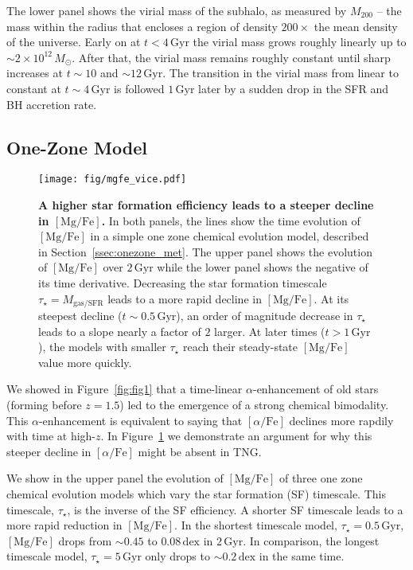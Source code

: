 \documentclass[linenumbers, twocolumn]{aastex631}
\newcommand{\Msun}{\ensuremath{M_{\odot}}}
\newcommand{\Gyr}{\ensuremath{\textrm{Gyr}}}
\newcommand{\MgFe}{\ensuremath{[\textrm{Mg}/\textrm{Fe}]}}
\newcommand{\alphaFe}{\ensuremath{[\alpha/\textrm{Fe}]}}
\newcommand{\dex}{\ensuremath{\textrm{dex}}}
\begin{document}
The lower panel shows the virial mass of the subhalo, as measured by $M_{200}$ -- the mass within the radius that encloses a region of density $200\times$ the mean density of the universe. Early on at $t<4\,\Gyr$ the virial mass grows roughly linearly up to $\sim2\times10^{12}\,\Msun$. After that, the virial mass remains roughly constant until sharp increases at $t\sim10$ and $\sim12\,\Gyr$. The transition in the virial mass from linear to constant at $t\sim4\,\Gyr$ is followed $1\,\Gyr$ later by a sudden drop in the SFR and BH accretion rate.

\subsection{One-Zone Model}\label{ssec:onezone}

\begin{figure}
  \centering
  \texttt{[image: fig/mgfe\_vice.pdf]}
  \caption{\textbf{A higher star formation efficiency leads to a steeper decline in \MgFe{}.} In both panels, the lines show the time evolution of \MgFe{} in a simple one zone chemical evolution model, described in Section~\ref{ssec:onezone_met}. The upper panel shows the evolution of \MgFe{} over $2\,\Gyr$ while the lower panel shows the negative of its time derivative. Decreasing the star formation timescale $\tau_{\star}=M_{\textrm{gas}/\textrm{SFR}}$ leads to a more rapid decline in \MgFe{}. At its steepest decline ($t\sim0.5\,\Gyr$), an order of magnitude decrease in $\tau_{\star}$ leads to a slope nearly a factor of $2$ larger. At later times ($t>1\,\Gyr$), the models with smaller $\tau_{\star}$ reach their steady-state \MgFe{} value more quickly.}
  \label{fig:vice}
\end{figure}

We showed in Figure~\ref{fig:fig1} that a time-linear $\alpha$-enhancement of old stars (forming before $z=1.5$) led to the emergence of a strong chemical bimodality. This $\alpha$-enhancement is equivalent to saying that \alphaFe{} declines more rapdily with time at high-$z$. In Figure~\ref{fig:vice} we demonstrate an argument for why this steeper decline in \alphaFe{} might be absent in TNG.

We show in the upper panel the evolution of \MgFe{} of three one zone chemical evolution models which vary the star formation (SF) timescale. This timescale, $\tau_{\star}$, is the inverse of the SF efficiency. A shorter SF timescale leads to a more rapid reduction in \MgFe{}. In the shortest timescale model, $\tau_{\star}=0.5\,\Gyr$, \MgFe{} drops from $\sim0.45$ to $0.08\,\dex$ in $2\,\Gyr$. In comparison, the longest timescale model, $\tau_{\star}=5\,\Gyr$ only drops to $\sim0.2\,\dex$ in the same time.
\end{document}
